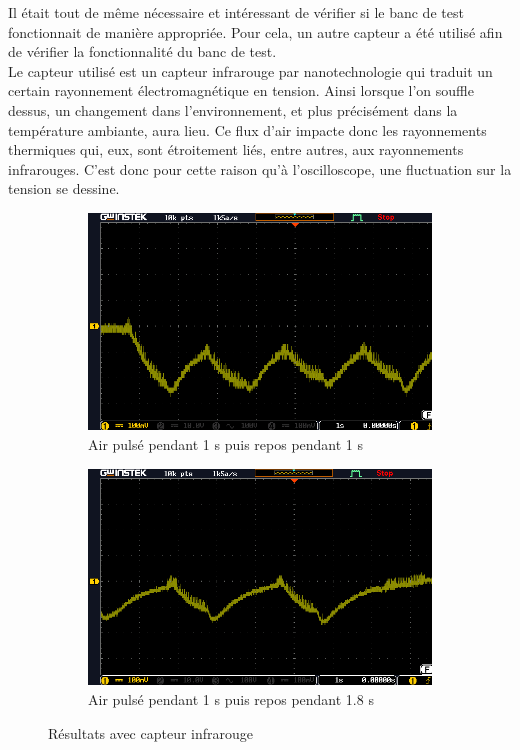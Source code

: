 Il était tout de même nécessaire et intéressant de vérifier si le banc de test fonctionnait de manière appropriée. Pour cela, un autre capteur
a été utilisé afin de vérifier la fonctionnalité du banc de test. \\
Le capteur utilisé est un capteur infrarouge par nanotechnologie qui traduit un certain rayonnement électromagnétique en tension. Ainsi lorsque l'on souffle
dessus, un changement dans l'environnement, et plus précisément dans la température ambiante, aura lieu. Ce flux d'air impacte donc
les rayonnements thermiques qui, eux, sont étroitement liés, entre autres, aux rayonnements infrarouges. C'est donc pour cette raison qu'à
l'oscilloscope, une fluctuation sur la tension se dessine.
\begin{figure}[H]
    \centering
    \begin{subfigure}[b]{0.45\textwidth}
        \hspace{-1 cm}
        \includegraphics[scale = 0.45]{assets/figures/CapteurIR_1s_1s.PNG}
        \caption{Air pulsé pendant 1 s puis repos pendant 1 s}
        \label{fig:1s1s}
    \end{subfigure}
    \begin{subfigure}[b]{0.45\textwidth}
        \centering
        \includegraphics[scale = 0.45]{assets/figures/1_8s_repos.PNG}
        \caption{Air pulsé pendant 1 s puis repos pendant 1.8 s}
        \label{fig:1_8s}
    \end{subfigure}
    \caption{Résultats avec capteur infrarouge}
    \label{fig:capteurIR}
\end{figure}

